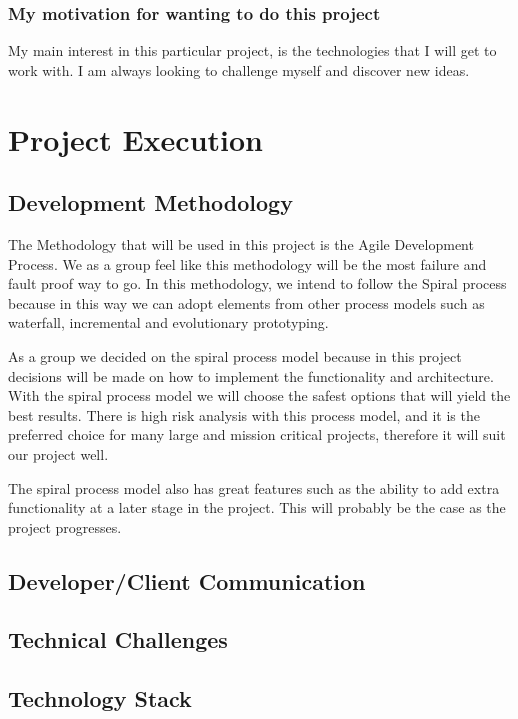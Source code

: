 \documentclass[a4paper,12pt]{article}
\begin{document}
			\subsubsection{My motivation for wanting to do this project}
			My main interest in this particular project, is the technologies that I will get to work with. I am always looking to challenge myself and discover new ideas.
	\newpage
	\section{Project Execution}
	
	\subsection{Development Methodology}  
	
	The Methodology that will be used in this project is the Agile Development Process. We as a group feel like this methodology will be the most failure and fault proof way to go. In this methodology, we intend to follow the Spiral process because in this way we can adopt elements from other process models such as waterfall, incremental and evolutionary prototyping.

	{\noindent}As a group we decided on the spiral process model because in this project decisions will be made on how to implement the functionality and architecture. With the spiral process model we will choose the safest options that will yield the best results. There is high risk analysis with this process model, and it is the preferred choice for many large and mission critical projects, therefore it will suit our project well.

	{\noindent}The spiral process model also has great features such as the ability to add extra functionality at a later stage in the project. This will probably be the case as the project progresses.

	
	\newpage
	\subsection{Developer/Client Communication}
	
	\newpage
	\subsection{Technical Challenges}
	
	\newpage
	\subsection{Technology Stack}
	
\end{document}
